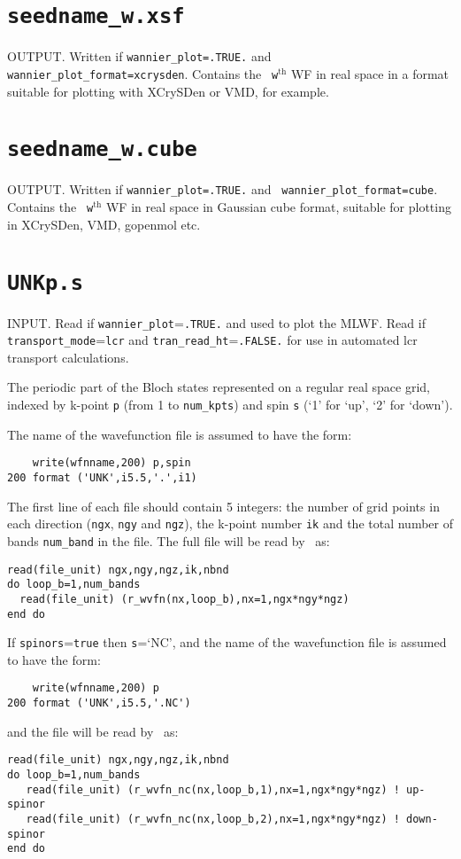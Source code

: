 \section{{\tt seedname\_w.xsf}}
OUTPUT. Written if {\tt wannier\_plot=.TRUE.} and {\tt
  wannier\_plot\_format=xcrysden}. Contains the {\tt
  w}$^{\mathrm{th}}$ WF in real space in a format suitable for
  plotting with XCrySDen or VMD, for example.

\section{{\tt seedname\_w.cube}}
OUTPUT. Written if {\tt wannier\_plot=.TRUE.} and {\tt
  wannier\_plot\_format=cube}. Contains the {\tt
  w}$^{\mathrm{th}}$ WF in real space in Gaussian cube format,
  suitable for plotting in XCrySDen, VMD, gopenmol etc.

\section{{\tt UNKp.s}}
INPUT. Read if \verb#wannier_plot#=\verb#.TRUE.# and used to plot the
MLWF. Read if \verb#transport_mode#=\verb#lcr# and \verb#tran_read_ht#=\verb#.FALSE.# 
for use in automated lcr transport calculations.

The periodic part of the Bloch states represented on a regular real
 space grid, indexed by k-point \verb#p# (from 1 to \verb#num_kpts#)
 and spin \verb#s# (`1' for `up', `2' for `down').


The name of the wavefunction file is assumed to have the form:

\begin{verbatim}
    write(wfnname,200) p,spin
200 format ('UNK',i5.5,'.',i1)
\end{verbatim}

The first line of each file should contain 5 integers: the number of
 grid points in each direction (\verb#ngx#, \verb#ngy# and
 \verb#ngz#), the k-point number \verb#ik# and the total number of
 bands \verb#num_band# in the file. The full file will be read by \wannier\ as:

\begin{verbatim} 
read(file_unit) ngx,ngy,ngz,ik,nbnd  
do loop_b=1,num_bands
  read(file_unit) (r_wvfn(nx,loop_b),nx=1,ngx*ngy*ngz)
end do
\end{verbatim}

If \verb#spinors#=\verb#true# then \verb#s#=`NC', and the name of the wavefunction file is assumed to have the form:
\begin{verbatim}
    write(wfnname,200) p
200 format ('UNK',i5.5,'.NC')
\end{verbatim}
and the file will be read by \wannier\ as:
\begin{verbatim} 
read(file_unit) ngx,ngy,ngz,ik,nbnd  
do loop_b=1,num_bands
   read(file_unit) (r_wvfn_nc(nx,loop_b,1),nx=1,ngx*ngy*ngz) ! up-spinor
   read(file_unit) (r_wvfn_nc(nx,loop_b,2),nx=1,ngx*ngy*ngz) ! down-spinor
end do  
\end{verbatim}


